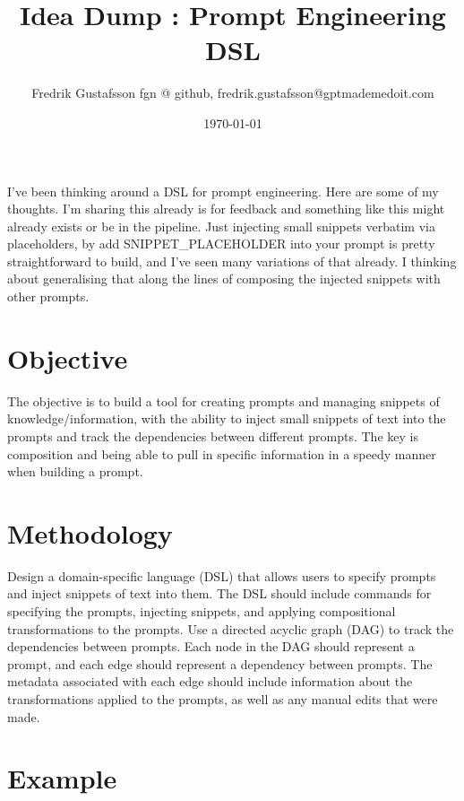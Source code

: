 \documentclass{article}
\begin{document}
\title{Idea Dump : Prompt Engineering DSL}
\author{Fredrik Gustafsson fgn @ github, fredrik.gustafsson@gptmademedoit.com}
\date{\today}

\maketitle

I've been thinking around a DSL for prompt engineering. Here are some of my thoughts. I'm sharing this already is for feedback and something like this might already exists or be in the pipeline. Just injecting small snippets verbatim via placeholders, by add SNIPPET\_PLACEHOLDER into your prompt is pretty straightforward to build, and I've seen many variations of that already. I thinking about generalising that along the lines of composing the injected snippets with other prompts.

\section{Objective}

The objective is to build a tool for creating prompts and managing snippets of knowledge/information, with the ability to inject small snippets of text into the prompts and track the dependencies between different prompts. The key is composition and being able to pull in specific information in a speedy manner when building a prompt. 

\section{Methodology}

Design a domain-specific language (DSL) that allows users to specify prompts and inject snippets of text into them. The DSL should include commands for specifying the prompts, injecting snippets, and applying compositional transformations to the prompts. Use a directed acyclic graph (DAG) to track the dependencies between prompts. Each node in the DAG should represent a prompt, and each edge should represent a dependency between prompts. The metadata associated with each edge should include information about the transformations applied to the prompts, as well as any manual edits that were made.

\section{Example}
\end{document}
